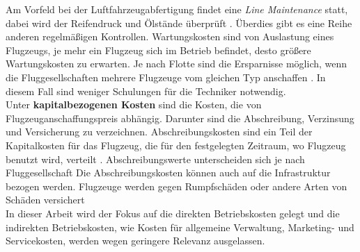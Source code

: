 Am Vorfeld bei der Luftfahrzeugabfertigung findet eine \textit{Line Maintenance} statt, 
dabei wird der Reifendruck und Ölstände überprüft \cite{conrady2019luftverkehr}. 
Überdies gibt es eine Reihe anderen regelmäßigen Kontrollen.
Wartungskosten sind von Auslastung eines Flugzeugs, je mehr ein Flugzeug sich im Betrieb befindet, desto größere
Wartungskosten zu erwarten. %
%
%
Je nach Flotte sind die Ersparnisse möglich, wenn die Fluggesellschaften mehrere Flugzeuge vom gleichen Typ anschaffen \cite{conrady2019luftverkehr}. 
In diesem Fall sind weniger Schulungen für die Techniker notwendig.\\
%
%
%
%
%
Unter \textbf{kapitalbezogenen Kosten} sind die Kosten, die von Flugzeuganschaffungspreis abhängig. Darunter
sind die Abschreibung, Verzinsung und Versicherung zu verzeichnen.
Abschreibungskosten sind ein Teil der Kapitalkosten für das Flugzeug, die für den festgelegten Zeitraum, wo Flugzeug benutzt wird, verteilt \cite{conrady2019luftverkehr}.
Abschreibungswerte unterscheiden sich je nach Fluggesellschaft
Die Abschreibungskosten können auch auf die Infrastruktur bezogen werden. 
Flugzeuge werden gegen Rumpfschäden oder andere Arten von Schäden versichert \cite{scholz_design_evaluation_doc}  \\
%
%
%
In dieser Arbeit wird der Fokus auf die direkten Betriebskosten gelegt und die indirekten Betriebskosten, wie Kosten für 
allgemeine Verwaltung, Marketing- und Servicekosten, werden wegen geringere Relevanz ausgelassen.\\
%
